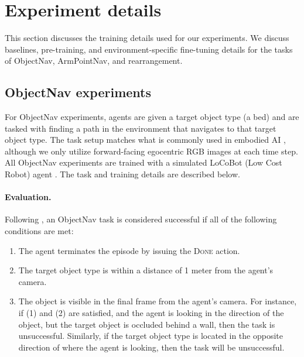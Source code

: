 

\section{Experiment details}

This section discusses the training details used for our experiments. We discuss baselines, \env{} pre-training, and environment-specific fine-tuning details for the tasks of ObjectNav, ArmPointNav, and rearrangement.


\subsection{ObjectNav experiments}

For ObjectNav experiments, agents are given a target object type (\eg a bed) and are tasked with finding a path in the environment that navigates to that target object type. The task setup matches what is commonly used in embodied AI \cite{Deitke2020RoboTHORAO, batra2020objectnav, khandelwal2021simple, Ramrakhya2022HabitatWebLE}, although we only utilize forward-facing egocentric RGB images at each time step. All ObjectNav experiments are trained with a simulated LoCoBot (Low Cost Robot) agent \cite{locobot}. The task and training details are described below.

\paragraph{Evaluation.}
Following \cite{Anderson2018OnEO}, an ObjectNav task is considered successful if all of the following conditions are met:
\begin{enumerate}[leftmargin=0.25in]
    \item The agent terminates the episode by issuing the \textsc{Done} action.
    \item The target object type is within a distance of 1 meter from the agent's camera.
    \item The object is visible in the final frame from the agent's camera. For instance, if (1) and (2) are satisfied, and the agent is looking in the direction of the object, but the target object is occluded behind a wall, then the task is unsuccessful. Similarly, if the target object type is located in the opposite direction of where the agent is looking, then the task will be unsuccessful.
\end{enumerate}


